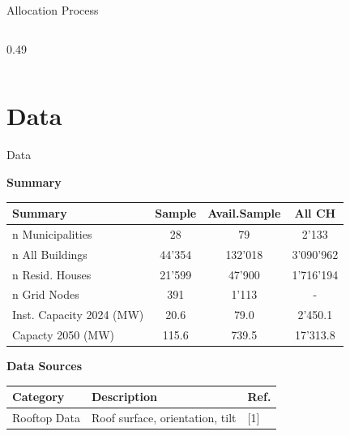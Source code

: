 \documentclass[10pt, aspectration=169]{beamer}
\begin{document}
\begin{frame}{Allocation Process}
\begin{columns}
\begin{column}{0.49\textwidth}
\end{column}

\end{columns}
\end{frame}

\section{Data} 



\begin{frame}{Data}


\centering
\textbf{Summary}\\
\vspace{0.2cm}

{\scriptsize
\setlength{\tabcolsep}{3.5pt}
\renewcommand{\arraystretch}{1.15}

\begin{tabular}{|l c  c c |}
    \hline
    \textbf{Summary}      & \textbf{Sample}     & \textbf{Avail.Sample}        & \textbf{All CH} \\
    \hline
    n Municipalities        & 28    & 79        & 2'133    \\
    n All Buildings         & 44'354            & 132'018              & 3'090'962    \\
    n Resid. Houses         & 21'599             & 47'900               & 1'716'194    \\
    n Grid Nodes            & 391        & 1'113            & -    \\
    Inst. Capacity 2024 (MW) & 20.6  & 79.0    & 2'450.1 \\
    Capacty 2050 (MW)       & 115.6  & 739.5    & 17'313.8    \\
    \hline       
\end{tabular}

}

\vspace{0.6cm}

\centering
\textbf{Data Sources}\\
\vspace{0.2cm}

{\scriptsize
\setlength{\tabcolsep}{3.5pt}
\renewcommand{\arraystretch}{1.15}

\begin{tabular}{|l l l|} %
    \hline
    \textbf{Category} & \textbf{Description} & \textbf{Ref.} \\
    \hline
    Rooftop Data 
        & Roof surface, orientation, tilt
        & [1] \\
        

\end{tabular}}
\end{frame}
\end{document}
